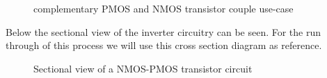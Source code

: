 \documentclass[10pt,a4paper,oneside]{article}
\newcounter{ct}
\begin{document}
\begin{figure}[H]
	\centering
	\begin{circuitdiagram}{20}{20}
	\end{circuitdiagram}
	\caption{complementary PMOS and NMOS transistor couple use-case}
\end{figure}

Below the sectional view of the inverter circuitry can be seen.
For the run through of this process we will use this cross section diagram as reference.
\begin{figure}[H]
	\centering
	\begin{tikzpicture}[node distance = 3cm, auto, thick,scale=0.5, every node/.style={transform shape}]
		
	\end{tikzpicture}
	\caption{Sectional view of a NMOS-PMOS transistor circuit}
\end{figure}
\end{document}

